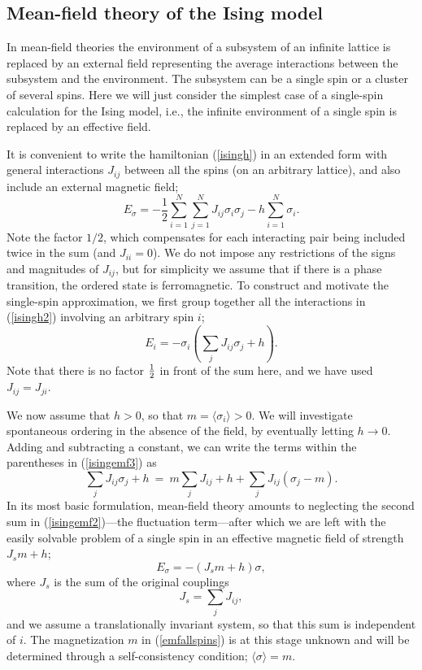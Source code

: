 \documentclass[draft,numberedheadings]{aipproc}
\newcommand{\half}{\hbox{$\frac{1}{2}$}}
\begin{document}
\subsection{Mean-field theory of the Ising model} 
\label{meanfield}

In mean-field theories the environment of a subsystem of an infinite lattice is replaced by an external field representing the average interactions between
the subsystem and the environment. The subsystem can be a single spin or a cluster of several spins. Here we will just consider the simplest case 
of a single-spin calculation for the Ising model, i.e., the infinite environment of a single spin is replaced by an effective field.

It is convenient to write the hamiltonian (\ref{isingh}) in an extended form with general interactions $J_{ij}$ between all the spins (on an arbitrary
lattice), and also include an external magnetic field;
\begin{equation}
E_\sigma = -\frac{1}{2}\sum_{i=1}^N\sum_{j=1}^N J_{ij} \sigma_i\sigma_j - h\sum_{i=1}^N \sigma_i.
\label{isingh2}
\end{equation}
Note the factor $1/2$, which compensates for each interacting pair being included twice in the sum (and $J_{ii}=0$). We do not impose any restrictions of
the signs and magnitudes of $J_{ij}$, but for simplicity we assume that if there is a phase transition, the ordered state is ferromagnetic. To construct and 
motivate the single-spin approximation, we first group together all the interactions in (\ref{isingh2}) involving an arbitrary spin $i$;
\begin{equation}
E_i = -\sigma_i \left (\sum_j J_{ij} \sigma_{j} + h \right ).
\label{isingemf3}
\end{equation}
Note that there is no factor $\half$ in front of the sum here, and we have used $J_{ij}=J_{ji}$. 

We now assume that $h>0$, so that $m=\langle \sigma_i\rangle > 0$. We will investigate spontaneous ordering in the absence of the field, by eventually 
letting $h \to 0$. Adding and subtracting a constant, we can write the terms within the parentheses in (\ref{isingemf3}) as
\begin{equation}
\sum_j J_{ij} \sigma_j + h ~=~ m\sum_j J_{ij} + h + \sum_j J_{ij}(\sigma_j - m).
\label{isingemf2}
\end{equation}
In its most basic formulation, mean-field theory amounts to neglecting the second sum in (\ref{isingemf2})---the fluctuation term---after which we are 
left with the easily solvable problem of a single spin in an effective magnetic field of strength $J_sm+h$;
\begin{equation}
E_\sigma = -(J_sm + h)\sigma,
\label{emfallspins}
\end{equation}
where $J_s$ is the sum of the original couplings
\begin{equation}
J_s = \sum_j J_{ij},
\label{jsumdef}
\end{equation}
and we assume a translationally invariant system, so that this sum is independent of $i$. The magnetization $m$ in (\ref{emfallspins}) is at this 
stage unknown and will be determined through a self-consistency condition; $\langle \sigma\rangle=m$.
\end{document}
